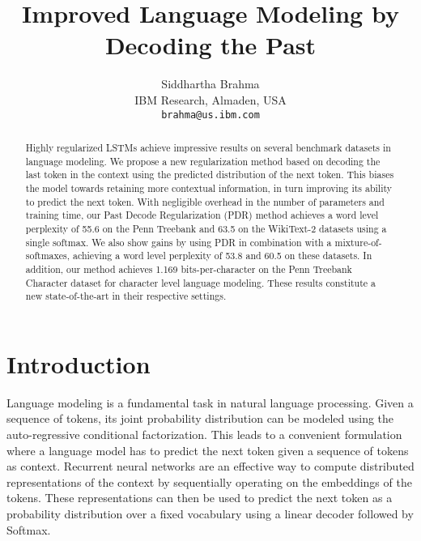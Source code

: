 \documentclass{article} \usepackage{iclr2019_conference,times}
\title{Improved Language Modeling by Decoding the Past}
\author{Siddhartha Brahma\\
IBM Research, Almaden, USA\\
\texttt{brahma@us.ibm.com} 
}
\begin{document}
\maketitle

\begin{abstract}
Highly regularized LSTMs achieve impressive results on several benchmark datasets in language modeling. 
We propose a new regularization method based on decoding the last token in the context using the predicted
distribution of the next token. This biases the model towards retaining more contextual information, in turn improving its ability to predict the next token. With negligible overhead in the number of parameters and training time, our Past Decode Regularization (PDR) method achieves a word level perplexity of 55.6 on the Penn Treebank and  63.5 on the WikiText-2 datasets using a single softmax. We also show gains by using PDR in combination with a mixture-of-softmaxes, achieving a word level perplexity of 53.8 and 60.5 on these datasets. In addition, our method achieves 1.169 bits-per-character on the Penn Treebank Character dataset for character level language modeling. These results constitute a new state-of-the-art in their respective settings.



\end{abstract}


\section{Introduction}
Language modeling is a fundamental task in natural language processing. Given a sequence of tokens, its joint probability distribution can be modeled using the auto-regressive conditional factorization. This leads to a convenient formulation where a language model has to predict the next token given a sequence of tokens as context. Recurrent neural networks are an effective way to compute distributed representations of the context by sequentially operating on the embeddings of the tokens. These representations can then be used to predict the next token as a probability distribution over a fixed vocabulary using a linear decoder followed by Softmax. 
\end{document}
